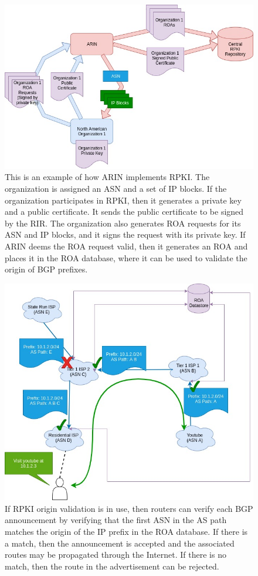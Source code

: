 \documentclass[conference]{IEEEtran}
\begin{document}
\begin{figure}
  \includegraphics[width=\linewidth]{images/rir-rpki-assignments.jpg}
  \caption{This is an example of how ARIN implements RPKI.  The organization is assigned an ASN and a set of IP blocks.  If the organization participates in RPKI, then it generates a private key and a public certificate.  It sends the public certificate to be signed by the RIR.  The organization also generates ROA requests for its ASN and IP blocks, and it signs the request with its private key.  If ARIN deems the ROA request valid, then it generates an ROA and places it in the ROA database, where it can be used to validate the origin of BGP prefixes.}
  \label{fig:rpki-assignment}
\end{figure}

\begin{figure}
  \includegraphics[width=\linewidth]{images/rpki-ops.jpg}
  \caption{If RPKI origin validation is in use, then routers can verify each BGP announcement by verifying that the first ASN in the AS path matches the origin of the IP prefix in the ROA database.  If there is a match, then the announcement is accepted and the associated routes may be propagated through the Internet.  If there is no match, then the route in the advertisement can be rejected.}
  \label{fig:rpki-ops}
\end{figure}
\end{document}
